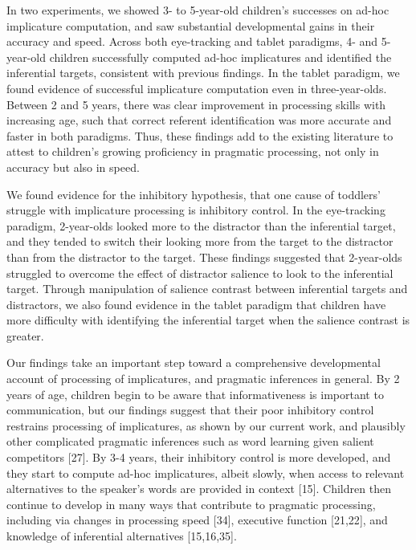 \documentclass{rsos}
\begin{document}
In two experiments, we showed 3- to 5-year-old children's successes on
ad-hoc implicature computation, and saw substantial developmental gains
in their accuracy and speed. Across both eye-tracking and tablet
paradigms, 4- and 5-year-old children successfully computed ad-hoc
implicatures and identified the inferential targets, consistent with
previous findings. In the tablet paradigm, we found evidence of
successful implicature computation even in three-year-olds. Between 2
and 5 years, there was clear improvement in processing skills with
increasing age, such that correct referent identification was more
accurate and faster in both paradigms. Thus, these findings add to the
existing literature to attest to children's growing proficiency in
pragmatic processing, not only in accuracy but also in speed.

We found evidence for the inhibitory hypothesis, that one cause of
toddlers' struggle with implicature processing is inhibitory control. In
the eye-tracking paradigm, 2-year-olds looked more to the distractor
than the inferential target, and they tended to switch their looking
more from the target to the distractor than from the distractor to the
target. These findings suggested that 2-year-olds struggled to overcome
the effect of distractor salience to look to the inferential target.
Through manipulation of salience contrast between inferential targets
and distractors, we also found evidence in the tablet paradigm that
children have more difficulty with identifying the inferential target
when the salience contrast is greater.

Our findings take an important step toward a comprehensive developmental
account of processing of implicatures, and pragmatic inferences in
general. By 2 years of age, children begin to be aware that
informativeness is important to communication, but our findings suggest
that their poor inhibitory control restrains processing of implicatures,
as shown by our current work, and plausibly other complicated pragmatic
inferences such as word learning given salient competitors {[}27{]}. By
3-4 years, their inhibitory control is more developed, and they start to
compute ad-hoc implicatures, albeit slowly, when access to relevant
alternatives to the speaker's words are provided in context {[}15{]}.
Children then continue to develop in many ways that contribute to
pragmatic processing, including via changes in processing speed
{[}34{]}, executive function {[}21,22{]}, and knowledge of inferential
alternatives {[}15,16,35{]}.
\end{document}

